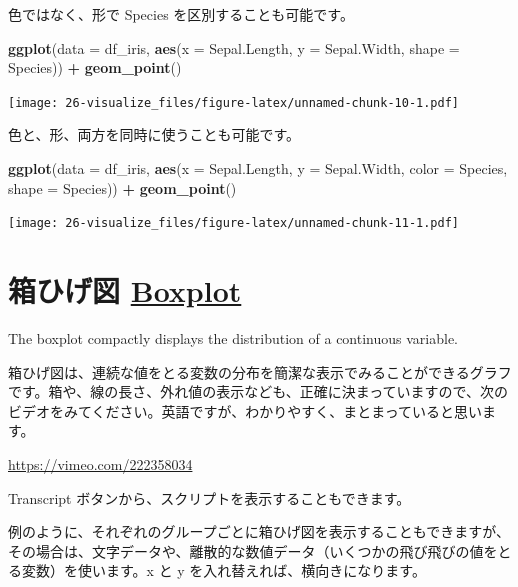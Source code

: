 \documentclass[
  xelatex, ja=standard]{bxjsbook}
\newenvironment{Shaded}{\begin{snugshade}}{\end{snugshade}}
\newcommand{\AttributeTok}[1]{\textcolor[rgb]{0.13,0.29,0.53}{#1}}
\newcommand{\FunctionTok}[1]{\textcolor[rgb]{0.13,0.29,0.53}{\textbf{#1}}}
\newcommand{\NormalTok}[1]{#1}
\newcommand{\SpecialCharTok}[1]{\textcolor[rgb]{0.81,0.36,0.00}{\textbf{#1}}}
\theoremstyle{definition}
\theoremstyle{definition}
\theoremstyle{definition}
\theoremstyle{definition}
\theoremstyle{remark}
\begin{document}
色ではなく、形で Species を区別することも可能です。

\begin{Shaded}
\begin{Highlighting}[]
\FunctionTok{ggplot}\NormalTok{(}\AttributeTok{data =}\NormalTok{ df\_iris, }\FunctionTok{aes}\NormalTok{(}\AttributeTok{x =}\NormalTok{ Sepal.Length, }\AttributeTok{y =}\NormalTok{ Sepal.Width, }\AttributeTok{shape =}\NormalTok{ Species)) }\SpecialCharTok{+}
  \FunctionTok{geom\_point}\NormalTok{()}
\end{Highlighting}
\end{Shaded}

\texttt{[image: 26-visualize\_files/figure-latex/unnamed-chunk-10-1.pdf]}

色と、形、両方を同時に使うことも可能です。

\begin{Shaded}
\begin{Highlighting}[]
\FunctionTok{ggplot}\NormalTok{(}\AttributeTok{data =}\NormalTok{ df\_iris, }\FunctionTok{aes}\NormalTok{(}\AttributeTok{x =}\NormalTok{ Sepal.Length, }\AttributeTok{y =}\NormalTok{ Sepal.Width, }\AttributeTok{color =}\NormalTok{ Species, }\AttributeTok{shape =}\NormalTok{ Species)) }\SpecialCharTok{+}
  \FunctionTok{geom\_point}\NormalTok{()}
\end{Highlighting}
\end{Shaded}

\texttt{[image: 26-visualize\_files/figure-latex/unnamed-chunk-11-1.pdf]}

\hypertarget{ux7bb1ux3072ux3052ux56f3-boxplot}{%
\section{\texorpdfstring{箱ひげ図 \href{https://ggplot2.tidyverse.org/reference/geom_boxplot.html}{Boxplot}}{箱ひげ図 Boxplot}}\label{ux7bb1ux3072ux3052ux56f3-boxplot}}

The boxplot compactly displays the distribution of a continuous variable.

箱ひげ図は、連続な値をとる変数の分布を簡潔な表示でみることができるグラフです。箱や、線の長さ、外れ値の表示なども、正確に決まっていますので、次のビデオをみてください。英語ですが、わかりやすく、まとまっていると思います。

\url{https://vimeo.com/222358034}

Transcript ボタンから、スクリプトを表示することもできます。

例のように、それぞれのグループごとに箱ひげ図を表示することもできますが、その場合は、文字データや、離散的な数値データ（いくつかの飛び飛びの値をとる変数）を使います。x と y を入れ替えれば、横向きになります。
\end{document}
